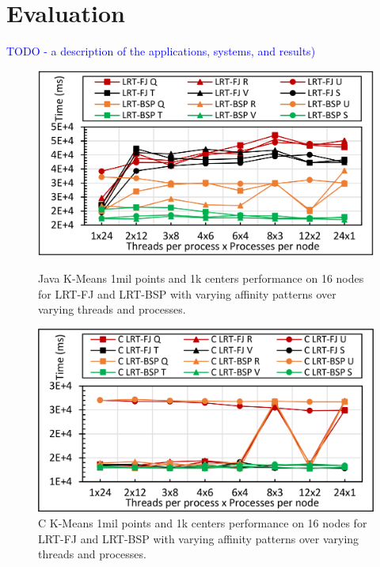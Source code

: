 \documentclass[10pt, conference, compsocconf]{IEEEtran}
\begin{document}
\section{Evaluation} \label{sec:evaluation}
\textcolor{blue}{TODO - a description of the applications, systems, and results)}

\begin{figure}[!htb]
    \centering
    \begin{minipage}{.49\textwidth}
        \centering        
        \includegraphics[width=1\columnwidth]{images/fig_kmeans_1mil_1k_binding_patterns}
        \caption{Java K-Means 1mil points and 1k centers performance on 16 nodes for \ac{LRT-FJ} and \ac{LRT-BSP} with varying affinity patterns over varying threads and processes.}
        \label{fig:fig_kmeans_1mil_1k_binding_patterns}
    \end{minipage}
    \hspace{1.4mm}
    \begin{minipage}{0.49\textwidth}
        \centering
        \includegraphics[width=1\columnwidth]{images/fig_C_kmeans_1mil_1k_binding_patterns}
        \caption{C K-Means 1mil points and 1k centers performance on 16 nodes for \ac{LRT-FJ} and \ac{LRT-BSP} with varying affinity patterns over varying threads and processes.}
        \label{fig:fig_C_kmeans_1mil_1k_binding_patterns}
    \end{minipage}   
\end{figure}
\end{document}
